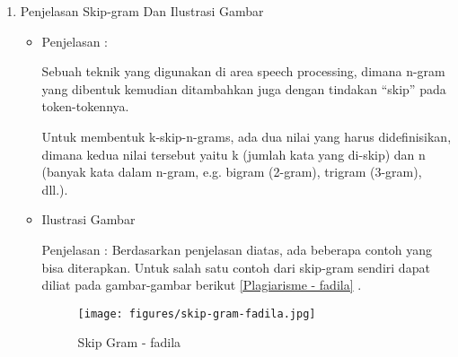 \begin{enumerate}
\begin{itemize}
\par
\par
\item Ilustrasi Gambar
\par Penjelasan : Berdasarkan penjelasan diatas, ada beberapa contoh yang bisa diterapkan. Untuk salah satu contoh dari mean dan standar devisiasi sendiri dapat diliat pada gambar berikut \ref{Mean-fadila} , \ref{Mean2-fadila}  dan \ref{Standar Devisiasi-fadila}.
\begin{figure}[!hbtp]
\centering
\texttt{[image: figures/mean-fadila.jpg]}
\caption{Mean-fadila}
\label{Mean-fadila}
\end{figure}
\par
\begin{figure}[!hbtp]
\centering
\texttt{[image: figures/mean2-fadila.jpg]}
\caption{Mean Lanjutan-fadila}
\label{Mean2-fadila}
\end{figure}
\par
\begin{figure}[!hbtp]
\centering
\texttt{[image: figures/deviasi-fadila.jpg]}
\caption{Standar Devisiasi-fadila}
\label{Standar Devisiasi-fadila}
\end{figure}
\par
\end{itemize}
\par
\par
\item Penjelasan Skip-gram Dan Ilustrasi Gambar
\begin{itemize}
\item  Penjelasan :
\par Sebuah  teknik yang digunakan di area speech processing, dimana n-gram yang dibentuk kemudian ditambahkan juga dengan tindakan “skip” pada token-tokennya. 
\par Untuk membentuk k-skip-n-grams, ada dua nilai yang harus didefinisikan, dimana kedua nilai tersebut yaitu k (jumlah kata yang di-skip) dan n (banyak kata dalam n-gram, e.g. bigram (2-gram), trigram (3-gram), dll.).
\par
\item Ilustrasi Gambar
\par Penjelasan : Berdasarkan penjelasan diatas, ada beberapa contoh yang bisa diterapkan. Untuk salah satu contoh dari skip-gram sendiri dapat diliat pada gambar-gambar berikut \ref{Plagiarisme - fadila} .
\begin{figure}[!hbtp]
\centering
\texttt{[image: figures/skip-gram-fadila.jpg]}
\caption{Skip Gram - fadila}

\end{figure}
\end{itemize}
\end{enumerate}
